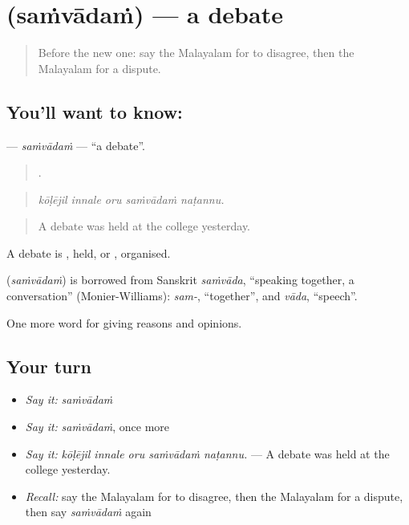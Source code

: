 \section[\texorpdfstring{\ml{സംവാദം} (saṁvādaṁ)}{സംവാദം (saṁvādaṁ)}]{ (saṁvādaṁ) — a debate}

\label{lesson:ML-C406-samvadam}



\begin{quote}
Before the new one: say the Malayalam for to disagree, then the Malayalam for a dispute.
\end{quote}

\subsection*{You'll want to know: }
\textbf{} — \emph{saṁvādaṁ} — \textquotedblleft{}a debate\textquotedblright{}.

\begin{quote}
    .
\end{quote}

\begin{quote}
\emph{kōḷējil innale oru saṁvādaṁ naṭannu.}
\end{quote}

\begin{quote}
A debate was held at the college yesterday.
\end{quote}

A debate is , held, or , organised.

\begin{cousinweb}
\textbf{} (\emph{saṁvādaṁ}) is borrowed from Sanskrit \emph{saṁvāda}, \textquotedblleft{}speaking together, a conversation\textquotedblright{} (Monier-Williams): \emph{sam-}, \textquotedblleft{}together\textquotedblright{}, and \emph{vāda}, \textquotedblleft{}speech\textquotedblright{}.
\end{cousinweb}

\begin{grammarlens}[title={What you've built}]
One more word for giving reasons and opinions.
\end{grammarlens}

\subsection*{Your turn}
\begin{itemize}
\raggedright
  \item \emph{Say it:} \emph{saṁvādaṁ}
  \item \emph{Say it:} \emph{saṁvādaṁ}, once more
  \item \emph{Say it:} \emph{kōḷējil innale oru saṁvādaṁ naṭannu.} — A debate was held at the college yesterday.
  \item \emph{Recall:} say the Malayalam for to disagree, then the Malayalam for a dispute, then say \emph{saṁvādaṁ} again
\end{itemize}

